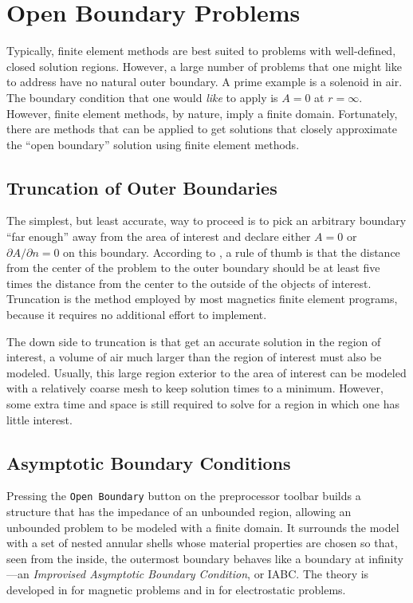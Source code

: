 \documentclass[12pt]{report}
\begin{document}
\section{Open Boundary Problems} \label{open_boundary}

Typically, finite element methods are best suited to problems with
well-defined, closed solution regions.  However, a large number of
problems that one might like to address have no natural outer
boundary.  A prime example is a solenoid in air.  The boundary
condition that one would {\em like} to apply is $A=0$ at
$r=\infty$.  However, finite element methods, by nature, imply a
finite domain.  Fortunately, there are methods that can be applied
to get solutions that closely approximate the ``open boundary''
solution using finite element methods.

\subsection{Truncation of Outer Boundaries}
The simplest, but least accurate, way to proceed is to pick an
arbitrary boundary ``far enough'' away from the area of interest
and declare either $A=0$ or $\partial A/\partial n=0$ on this
boundary.  According to \cite{chen}, a rule of thumb is that the
distance from the center of the problem to the outer boundary
should be at least five times the distance from the center to the
outside of the objects of interest.  Truncation is the method
employed by most magnetics finite element programs, because it
requires no additional effort to implement.

The down side to truncation is that get an accurate solution in the
region of interest, a volume of air much larger than the region of
interest must also be modeled.  Usually, this large region exterior
to the area of interest can be modeled with a relatively coarse
mesh to keep solution times to a minimum.  However, some extra time
and space is still required to solve for a region in which one has
little interest.

\subsection{Asymptotic Boundary Conditions}

Pressing the {\tt Open Boundary} button on the preprocessor toolbar 
builds a structure that has the impedance of an unbounded region, allowing
an unbounded problem to be modeled with a finite domain.  It surrounds the 
model with a set of nested annular shells whose material properties are 
chosen so that, seen from the inside, the outermost boundary behaves like 
a boundary at infinity---an {\em Improvised Asymptotic Boundary Condition},
or IABC.  The theory is developed in \cite{iabcmag} for magnetic problems
and in \cite{iabcelec} for electrostatic problems.
\end{document}
